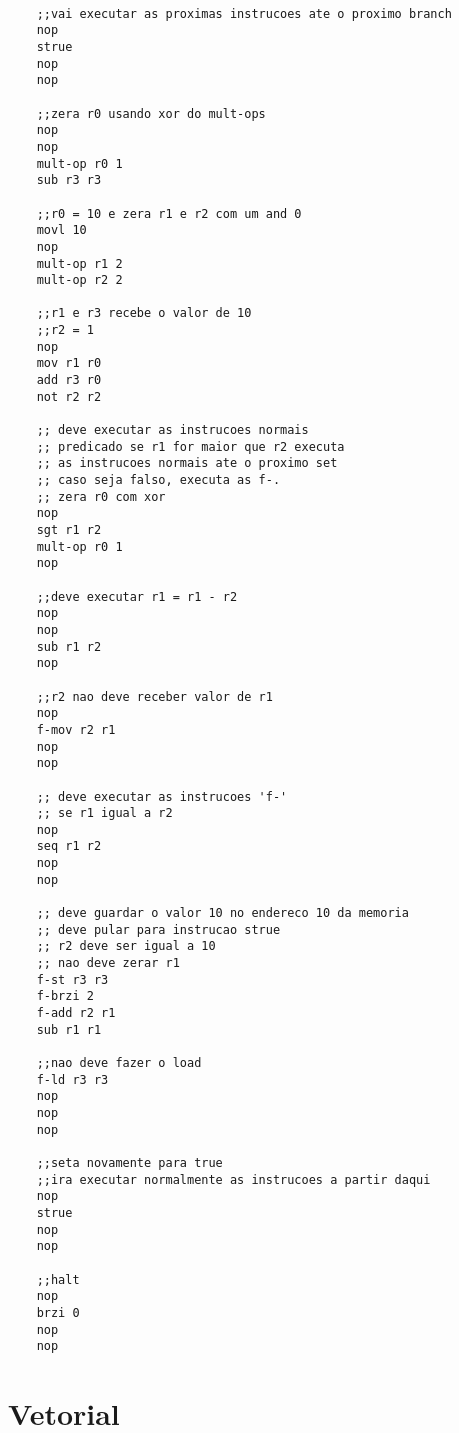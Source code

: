 \documentclass{article}
\begin{document}
    \captionsetup[lstlisting]{labelformat=empty}
    \renewcommand{\lstlistingname}{}
    \begin{lstlisting}[caption={Assembly Para de Predicados}]

    ;;vai executar as proximas instrucoes ate o proximo branch
    nop
    strue
    nop
    nop

    ;;zera r0 usando xor do mult-ops
    nop
    nop
    mult-op r0 1
    sub r3 r3

    ;;r0 = 10 e zera r1 e r2 com um and 0
    movl 10
    nop
    mult-op r1 2
    mult-op r2 2

    ;;r1 e r3 recebe o valor de 10
    ;;r2 = 1
    nop
    mov r1 r0
    add r3 r0
    not r2 r2

    ;; deve executar as instrucoes normais
    ;; predicado se r1 for maior que r2 executa 
    ;; as instrucoes normais ate o proximo set
    ;; caso seja falso, executa as f-.
    ;; zera r0 com xor
    nop
    sgt r1 r2
    mult-op r0 1 
    nop

    ;;deve executar r1 = r1 - r2
    nop
    nop
    sub r1 r2
    nop

    ;;r2 nao deve receber valor de r1
    nop
    f-mov r2 r1
    nop
    nop

    ;; deve executar as instrucoes 'f-'
    ;; se r1 igual a r2 
    nop
    seq r1 r2
    nop
    nop

    ;; deve guardar o valor 10 no endereco 10 da memoria
    ;; deve pular para instrucao strue
    ;; r2 deve ser igual a 10
    ;; nao deve zerar r1
    f-st r3 r3 
    f-brzi 2
    f-add r2 r1
    sub r1 r1

    ;;nao deve fazer o load
    f-ld r3 r3
    nop
    nop
    nop

    ;;seta novamente para true
    ;;ira executar normalmente as instrucoes a partir daqui
    nop 
    strue
    nop
    nop

    ;;halt
    nop
    brzi 0
    nop
    nop

    \end{lstlisting}

    \section{Vetorial}
\end{document}

